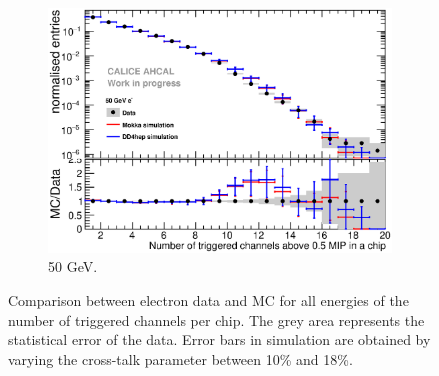 \begin{figure}[htbp!]
\begin{subfigure}[t]{0.49\textwidth}
    \includegraphics[width=1\textwidth]{../Thesis_Plots/Timing/Electrons/Plots/Comparison_SimData_Electrons_nHits_50GeV.eps}
    \caption{50 GeV.}\label{fig:elec_sim_data_nHits_50GeV}
  \end{subfigure}
  \caption{Comparison between electron data and MC for all energies of the number of triggered channels per chip. The grey area represents the statistical error of the data. Error bars in simulation are obtained by varying the cross-talk parameter between 10\% and 18\%.}
  \label{fig:sim_data_elec_nHits}
\end{figure}


